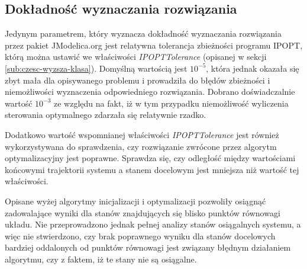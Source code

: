 
\subsection{Dokładność wyznaczania rozwiązania}
\label{sub:opt-dokladnosc}

Jedynym parametrem, który wyznacza dokładność wyznaczania rozwiązania przez pakiet JModelica.org jest relatywna tolerancja zbieżności programu IPOPT, którą można ustawić we właściwości \emph{IPOPTTolerance} (opisanej w sekcji \ref{sub:czesc-wyzsza-klasa}). Domyślną wartością jest $10^{-5}$, która jednak okazała się zbyt mała dla opisywanego problemu i prowadziła do błędów zbieżności i niemożliwości wyznaczenia odpowiedniego rozwiązania. Dobrano doświadczalnie wartość $10^{-3}$ ze względu na fakt, iż w tym przypadku niemożliwość wyliczenia sterowania optymalnego zdarzała się relatywnie rzadko.

Dodatkowo wartość wspomnianej właściwości \emph{IPOPTTolerance} jest również wykorzystywana do sprawdzenia, czy rozwiązanie zwrócone przez algorytm optymalizacyjny jest poprawne. Sprawdza się, czy odległość między wartościami końcowymi trajektorii systemu a stanem docelowym jest mniejsza niż wartość tej właściwości.

Opisane wyżej algorytmy inicjalizacji i optymalizacji pozwoliły osiągnąć zadowalające wyniki dla stanów znajdujących się blisko punktów równowagi układu. Nie przeprowadzono jednak pełnej analizy stanów osiągalnych systemu, a więc nie stwierdzono, czy brak poprawnego wyniku dla stanów docelowych bardziej oddalonych od punktów równowagi jest związany błędnym działaniem algorytmu, czy z faktem, iż te stany nie są osiągalne.
